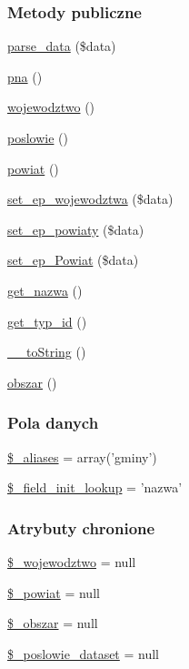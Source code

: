 \subsubsection*{Metody publiczne}
\begin{DoxyCompactItemize}
\item 
\hyperlink{classep___gmina_ac313783ab7146c71e639bf7ddf54b0db}{parse\-\_\-data} (\$data)
\item 
\hyperlink{classep___gmina_a49db364aca99bded10aecb3c03b88151}{pna} ()
\item 
\hyperlink{classep___gmina_a2c735142a4af50d47b17d8103a9ab9ab}{wojewodztwo} ()
\item 
\hyperlink{classep___gmina_a0f86bc9d504d1c4a3a60c1585cb85f97}{poslowie} ()
\item 
\hyperlink{classep___gmina_afeb09b2f0c7a3cd1d9bfe029ffdd57ea}{powiat} ()
\item 
\hyperlink{classep___gmina_a12fb54f8ef9461d5c7cad089ab5e35de}{set\-\_\-ep\-\_\-wojewodztwa} (\$data)
\item 
\hyperlink{classep___gmina_aad05e7a4455e489123c3cfc364b8583a}{set\-\_\-ep\-\_\-powiaty} (\$data)
\item 
\hyperlink{classep___gmina_abb5d24d51da3de254009201026fb912b}{set\-\_\-ep\-\_\-\-Powiat} (\$data)
\item 
\hyperlink{classep___gmina_ac0818f0049d7b84f08f77128f54cee36}{get\-\_\-nazwa} ()
\item 
\hyperlink{classep___gmina_a4b45567d267edbb1938513035022bf89}{get\-\_\-typ\-\_\-id} ()
\item 
\hyperlink{classep___gmina_a7516ca30af0db3cdbf9a7739b48ce91d}{\-\_\-\-\_\-to\-String} ()
\item 
\hyperlink{classep___gmina_aa05db5ea090acb5d431aff0bbb8b97a6}{obszar} ()
\end{DoxyCompactItemize}
\subsubsection*{Pola danych}
\begin{DoxyCompactItemize}
\item 
\hyperlink{classep___gmina_ab4e31d75f0bc5d512456911e5d01366b}{\$\-\_\-aliases} = array('gminy')
\item 
\hyperlink{classep___gmina_a4a4d54ae35428077a7c61ec8a5139af3}{\$\-\_\-field\-\_\-init\-\_\-lookup} = 'nazwa'
\end{DoxyCompactItemize}
\subsubsection*{Atrybuty chronione}
\begin{DoxyCompactItemize}
\item 
\hyperlink{classep___gmina_a2a0a830e555a9e31b5118be82dbc33c7}{\$\-\_\-wojewodztwo} = null
\item 
\hyperlink{classep___gmina_a928275f8378baade592a64f89da229ef}{\$\-\_\-powiat} = null
\item 
\hyperlink{classep___gmina_a78dbe56396c80cf6fc9d3f319bb5ec8c}{\$\-\_\-obszar} = null
\item 
\hyperlink{classep___gmina_a7035a68c4348c4759daf71ac5c02b72e}{\$\-\_\-poslowie\-\_\-dataset} = null
\end{DoxyCompactItemize}
